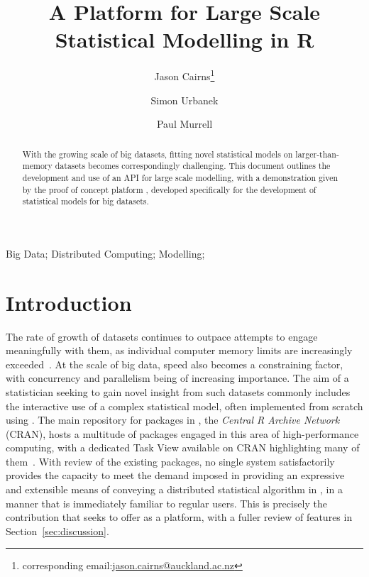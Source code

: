 \documentclass[letterpaper, inpress]{jds} %
\title{A Platform for Large Scale Statistical Modelling in R}
\author[1]{Jason Cairns\thanks{corresponding email:\href{mailto:jason.cairns@auckland.ac.nz}{jason.cairns@auckland.ac.nz}}}
\author[1]{Simon Urbanek}
\author[1]{Paul Murrell}
\affil[1]{Department of Statistics, University of Auckland, New Zealand}
\begin{document}
\maketitle

\begin{abstract}
With the growing scale of big datasets, fitting novel statistical models on larger-than-memory datasets becomes correspondingly challenging.
This document outlines the development and use of an API for large scale modelling, with a demonstration given by the proof of concept platform , developed specifically for the development of statistical models for big datasets.
\end{abstract}
\begin{keywords} %
Big Data;
Distributed Computing;
Modelling;
\end{keywords}

\section{Introduction}%
\label{sec:intro}

The rate of growth of datasets continues to outpace attempts to engage meaningfully with them, as individual computer memory limits are increasingly exceeded~\citep{kleppmann2017dataintensive}.
At the scale of big data, speed also becomes a constraining factor, with concurrency and parallelism being of increasing importance.
The aim of a statistician seeking to gain novel insight from such datasets commonly includes the interactive use of a complex statistical model, often implemented from scratch using .
The main repository for packages in , the \textit{Central R Archive Network} (CRAN), hosts a multitude of packages engaged in this area of high-performance computing, with a dedicated Task View available on CRAN highlighting many of them~\citep{cran_hpc}.
With review of the existing packages, no single system satisfactorily provides the capacity to meet the demand imposed in providing an expressive and extensible means of conveying a distributed statistical algorithm in , in a manner that is immediately familiar to regular  users.
This is precisely the contribution that  seeks to offer as a platform, with a fuller review of features in Section~\ref{sec:discussion}.
\end{document}
